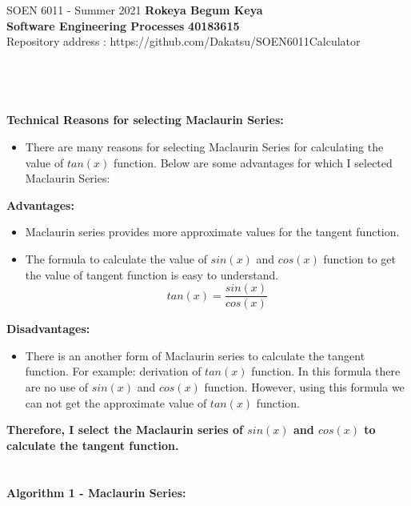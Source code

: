 \documentclass[a4paper, 11pt]{report}
\begin{document}
\section*{}
\normalsize {SOEN 6011 - Summer 2021} \hfill \textbf{Rokeya Begum Keya} \\
\textbf{ Software Engineering Processes}  \hfill \textbf{40183615} \\
\hfill Repository address : https://github.com/Dakatsu/SOEN6011Calculator
\\\\\\
\textbf{\\ \\ Technical Reasons for selecting Maclaurin Series: }
\begin{itemize}
\item There are many reasons for selecting Maclaurin Series for calculating the value of $tan(x)$ function. Below are some advantages for which I selected Maclaurin Series:
\end{itemize}
\textbf{Advantages: }
\begin{itemize}
\item Maclaurin series provides more approximate values for the tangent function.
\item The formula to calculate the value of $sin(x)$ and $cos(x)$ function to get the value of tangent function is easy to understand.\[tan(x) = \frac{sin(x)}{cos(x)}\]
\end{itemize}
\textbf{Disadvantages: }
\begin{itemize}
\item There is an another form of Maclaurin series to calculate the tangent function. For example: derivation of $tan(x)$ function. In this formula there are no use of $sin(x)$ and $cos(x)$ function. However, using this formula we can not get the approximate value of $tan(x)$ function.
\end{itemize}
\textbf{Therefore, I select the Maclaurin series of $sin(x)$ and $cos(x)$ to calculate the tangent function.}
\\
\textbf{\\ \\ Algorithm 1 - Maclaurin Series: } 
\end{document}
